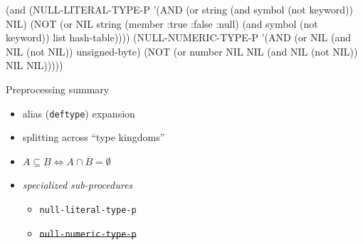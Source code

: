 \documentclass[aspectratio=169]{beamer}
\renewcommand\code[1]{\texttt{#1}}
\begin{document}
\begin{frame}[fragile]
  \begin{popup}{.7}
    \vspace*{-2em}
    \begin{mintedcodebox}
\begin{localcl}
(and (NULL-LITERAL-TYPE-P '(AND (or string
                                    (and symbol
                                         (not keyword))
                                    NIL)
                                (NOT (or NIL
                                         string
                                         (member :true :false :null)
                                         (and symbol
                                              (not keyword))
                                         list
                                         hash-table))))
     (NULL-NUMERIC-TYPE-P '(AND (or NIL
                                    (and NIL
                                         (not NIL))
                                    unsigned-byte)
                                (NOT (or number
                                         NIL
                                         NIL
                                         (and NIL
                                              (not NIL))
                                         NIL
                                         NIL)))))
\end{localcl}
    \end{mintedcodebox}
  \end{popup}

  \begin{popup}{.75}
    \begin{macosbox}{Preprocessing summary}
      \begin{itemize}
      \item alias (\code{deftype}) expansion
      \item splitting across ``type kingdoms''
      \item $A \subseteq B \Leftrightarrow A \cap \overline B = \emptyset$
      \item \emph{specialized sub-procedures}
        \begin{itemize}
        \item \code{null-literal-type-p}
        \item \sout{\code{null-numeric-type-p}}
        \end{itemize}
      \end{itemize}
    \end{macosbox}
  \end{popup}
\end{frame}
\end{document}
